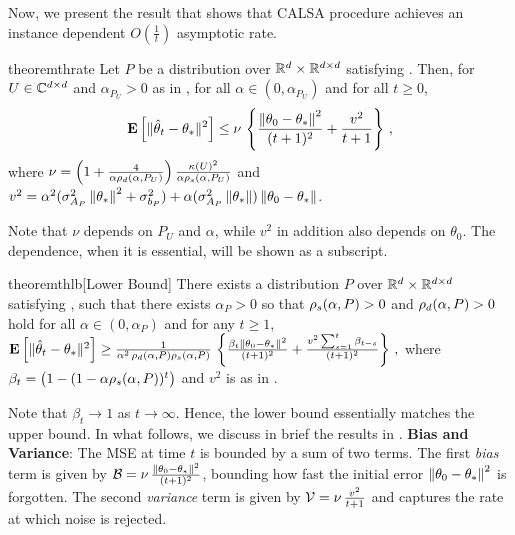 Now, we present the result that shows that CALSA procedure achieves an instance dependent $O(\frac{1}{t})$ asymptotic rate.
\begin{restatable}{theorem}{thrate}\label{th:rate}
Let $P$ be a distribution over $\mathbb{R}^d\times \mathbb{R}^{d \times d}$ satisfying .
Then, for  $U\in\mathbb{C}^{d \times d}$ and $\alpha_{P_U}>0$ as in ,
for all $\alpha\in (0,\alpha_{P_U})$ and for all $t\ge 0$,
\begin{align*}
\mathbf{E}\left[\| \hat{\theta}_t-\theta_*\|^2\right]
\leq
\nu\,
\left\{\frac{\left\| \theta_0-\theta_*\right\|^2}{(t+1)^2}+ \frac{v^2}{t+1} \right\}\,,
\end{align*}
where $\nu = \left(1+\tfrac4{\alpha\rho_d(\alpha,P_U)}\right)\tfrac{\kappa(U)^2}{\alpha \rho_s(\alpha,P_U)}$ and
$v^2 = 
\alpha^2(\sigma_{A_P}^2\left\| \theta_*\right\|^2+\sigma_{b_P}^2)+\alpha (\sigma_{A_P}^2\left\| \theta_*\right\|)\left\| \theta_0-\theta_*\right\|$.
\end{restatable}
Note that $\nu$ depends on $P_U$ and $\alpha$, while $v^2$ in addition also depends on $\theta_0$. The dependence,  when it is essential, will be shown as a subscript.


\begin{restatable}{theorem}{thlb}[Lower Bound]\label{th:lb}
There exists a distribution $P$ over $\mathbb{R}^d\times \mathbb{R}^{d \times d}$ satisfying , such that
there exists $\alpha_P>0$ so that $\rho_s(\alpha,P)>0$ and $\rho_d(\alpha,P)>0$ hold for all $\alpha\in (0,\alpha_P)$ and
for any $t\ge 1$,  $\mathbf{E}\left[\| \hat{\theta}_t-\theta_*\|^2\right] 
\geq \frac{1}{\alpha^2 \, \rho_d(\alpha,P)\rho_s(\alpha,P)} \,\left\{ \frac{\beta_t \left\| \theta_0-\theta_*\right\|^2}{(t+1)^2} 
+ \frac{v^2\sum_{s=1}^t \beta_{t-s}  }{(t+1)^2} \right\}\,,$
where $\beta_{t} =  \big(1-(1-\alpha \rho_s(\alpha,P))^t\big)$ and $v^2$ is as in .
\end{restatable}
Note that $\beta_t \to 1$ as $t\to\infty$. Hence, the lower bound essentially matches the upper bound.
In what follows, we discuss in brief the results in . 
\textbf{Bias and Variance}: The MSE at time $t$ is bounded by a sum of two terms. The first \emph{bias} term is given by $\mathcal{B}=\nu \,\frac{\left\| \theta_0-\theta_*\right\|^2}{(t+1)^2}$, bounding how fast the initial error $\left\| \theta_0-\theta_*\right\|^2$ is forgotten. The second \emph{variance} term is given by $\mathcal{V}=\nu\, \frac{v^2}{t+1} $ and captures the rate at which noise is rejected. 


